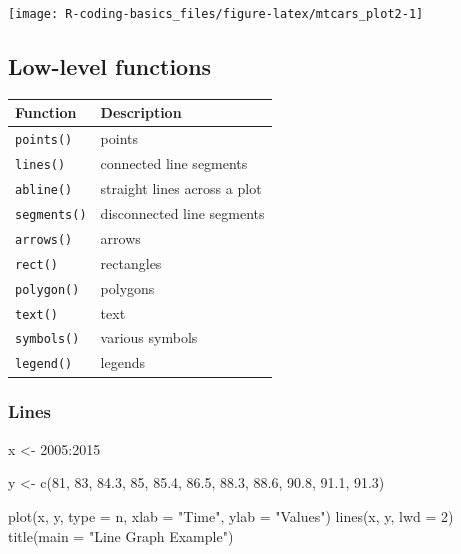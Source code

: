 \documentclass[
]{book}
\newenvironment{Shaded}{\begin{snugshade}}{\end{snugshade}}
\newcommand{\AttributeTok}[1]{\textcolor[rgb]{0.77,0.63,0.00}{#1}}
\newcommand{\DecValTok}[1]{\textcolor[rgb]{0.00,0.00,0.81}{#1}}
\newcommand{\FloatTok}[1]{\textcolor[rgb]{0.00,0.00,0.81}{#1}}
\newcommand{\FunctionTok}[1]{\textcolor[rgb]{0.00,0.00,0.00}{#1}}
\newcommand{\NormalTok}[1]{#1}
\newcommand{\OtherTok}[1]{\textcolor[rgb]{0.56,0.35,0.01}{#1}}
\newcommand{\SpecialCharTok}[1]{\textcolor[rgb]{0.00,0.00,0.00}{#1}}
\newcommand{\StringTok}[1]{\textcolor[rgb]{0.31,0.60,0.02}{#1}}
\begin{document}
\begin{center}\texttt{[image: R-coding-basics\_files/figure-latex/mtcars\_plot2-1]} \end{center}

\hypertarget{low-level-functions-1}{%
\subsection{Low-level functions}\label{low-level-functions-1}}

\begin{longtable}[]{@{}ll@{}}
\toprule()
Function & Description \\
\midrule()
\endhead
\texttt{points()} & points \\
\texttt{lines()} & connected line segments \\
\texttt{abline()} & straight lines across a plot \\
\texttt{segments()} & disconnected line segments \\
\texttt{arrows()} & arrows \\
\texttt{rect()} & rectangles \\
\texttt{polygon()} & polygons \\
\texttt{text()} & text \\
\texttt{symbols()} & various symbols \\
\texttt{legend()} & legends \\
\bottomrule()
\end{longtable}

\hypertarget{lines}{%
\subsubsection*{Lines}\label{lines}}

\begin{Shaded}
\begin{Highlighting}[]
\NormalTok{x }\OtherTok{\textless{}{-}} \DecValTok{2005}\SpecialCharTok{:}\DecValTok{2015}

\NormalTok{y }\OtherTok{\textless{}{-}} \FunctionTok{c}\NormalTok{(}\DecValTok{81}\NormalTok{, }\DecValTok{83}\NormalTok{, }\FloatTok{84.3}\NormalTok{, }\DecValTok{85}\NormalTok{, }\FloatTok{85.4}\NormalTok{, }\FloatTok{86.5}\NormalTok{, }\FloatTok{88.3}\NormalTok{, }
       \FloatTok{88.6}\NormalTok{, }\FloatTok{90.8}\NormalTok{, }\FloatTok{91.1}\NormalTok{, }\FloatTok{91.3}\NormalTok{)}

\FunctionTok{plot}\NormalTok{(x, y, }\AttributeTok{type =} \StringTok{\textquotesingle{}n\textquotesingle{}}\NormalTok{, }\AttributeTok{xlab =} \StringTok{"Time"}\NormalTok{, }\AttributeTok{ylab =} \StringTok{"Values"}\NormalTok{)}
\FunctionTok{lines}\NormalTok{(x, y, }\AttributeTok{lwd =} \DecValTok{2}\NormalTok{)}
\FunctionTok{title}\NormalTok{(}\AttributeTok{main =} \StringTok{"Line Graph Example"}\NormalTok{)}
\end{Highlighting}
\end{Shaded}
\end{document}
